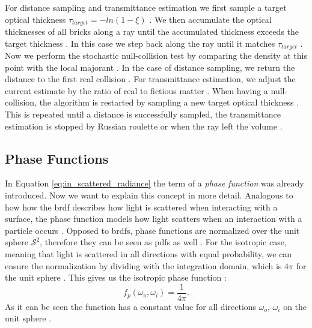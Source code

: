 For distance sampling and transmittance estimation we first sample a target optical thickness $\tau_{target}=-ln(1-\xi)$ \cite{brick_grid}.
We then accumulate the optical thicknesses of all bricks along a ray until the accumulated thickness exceeds the target thickness \cite{brick_grid}.
In this case we step back along the ray until it matches $\tau_{target}$ \cite{brick_grid}.
Now we perform the stochastic null-collision test by comparing the density at this point with the local majorant \cite{brick_grid}.
In the case of distance sampling, we return the distance to the first real collision \cite{brick_grid}.
For transmittance estimation, we adjust the current estimate by the ratio of real to fictious matter \cite{brick_grid}.
When having a null-collision, the algorithm is restarted by sampling a new target optical thickness \cite{brick_grid}.
This is repeated until a distance is successfully sampled, the transmittance estimation is stopped by Russian roulette or when the ray left the volume \cite{brick_grid}.

\subsection{Phase Functions}
\label{subsec:phase_function}
In Equation \ref{eq:in_scattered_radiance} the term of a \textit{phase function} was already introduced.
Now we want to explain this concept in more detail.
Analogous to how how the \ac{brdf} describes how light is scattered when interacting with a surface, the phase function models how light scatters when an interaction with a particle occurs \cite{novak_overview}.
Opposed to \acsp{brdf}, phase functions are normalized over the unit sphere $\mathcal{S}^2$, therefore they can be seen as \acsp{pdf} as well \cite{pbr}.
For the isotropic case, meaning that light is scattered in all directions with equal probability, we can ensure the normalization by dividing with the integration domain, which is $4\pi$ for the unit sphere \cite{pbr}.
This gives us the isotropic phase function \cite{novak_overview}:
\begin{equation*}
    f_p(\omega_o, \omega_i)=\frac{1}{4\pi}.
\end{equation*}
As it can be seen the function has a constant value for all directions $\omega_o$, $\omega_i$ on the unit sphere \cite{novak_overview}.

